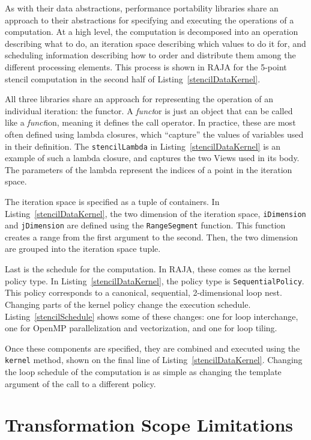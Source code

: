 As with their data abstractions, performance portability libraries share an approach to their abstractions for specifying and executing the operations of a computation.
At a high level, the computation is decomposed into an operation describing what to do, an iteration space describing which values to do it for, and scheduling information describing how to order and distribute them among the different processing elements.
This process is shown in RAJA for the 5-point stencil computation in the second half of Listing~\ref{stencilDataKernel}.

All three libraries share an approach for representing the operation of an individual iteration: the functor.
A \textit{funct}or is just an object that can be called like a \textit{funct}ion, meaning it defines the call operator. 
In practice, these are most often defined using lambda closures, which ``capture'' the values of variables used in their definition.
The \verb.stencilLambda. in Listing~\ref{stencilDataKernel} is an example of such a lambda closure, and captures the two Views used in its body.
The parameters of the lambda represent the indices of a point in the iteration space.

The iteration space is specified as a tuple of containers.
In Listing~\ref{stencilDataKernel}, the two dimension of the iteration space, \verb.iDimension. and \verb.jDimension. are defined using the \verb.RangeSegment. function.
This function creates a range from the first argument to the second.
Then, the two dimension are grouped into the iteration space tuple.

Last is the schedule for the computation.
In RAJA, these comes as the kernel policy type.
In Listing~\ref{stencilDataKernel}, the policy type is \verb.SequentialPolicy..
This policy corresponds to a canonical, sequential, 2-dimensional loop nest.
Changing parts of the kernel policy change the execution schedule.  %
Listing~\ref{stencilSchedule} shows some of these changes: one for loop interchange, one for OpenMP parallelization and vectorization, and one for loop tiling.

Once these components are specified, they are combined and executed using the \verb.kernel. method, shown on the final line of Listing~\ref{stencilDataKernel}.
Changing the loop schedule of the computation is as simple as changing the template argument of the call to a different policy.

\section{Transformation Scope Limitations}

